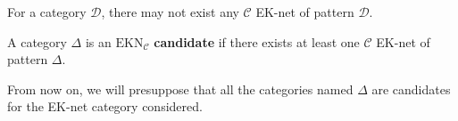 
\begin{rem}
    For a category $\mathcal{D}$, there may not exist any $\mathcal{C}$ EK-net of pattern $\mathcal{D}$.
\end{rem}

\begin{defn}[EK candidate]
    A category $\Delta$ is an $\text{EKN}_{\mathcal{C}}$ \textbf{candidate} if there exists at least one $\mathcal{C}$ EK-net of pattern $\Delta$.
\end{defn}

\begin{note}
    From now on, we will presuppose that all the categories named $\Delta$ are candidates for the EK-net category considered.
\end{note}









